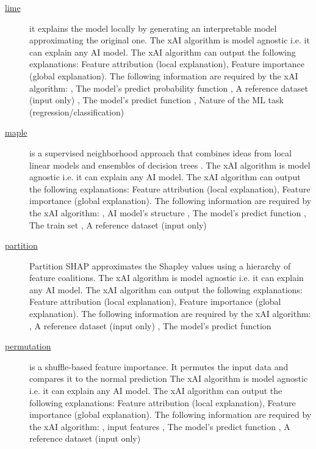 \begin{description}
\item[\href{https://github.com/Karim-53/Compare-xAI/blob/main/explainers/lime.py}{lime}] 
 \citep{ribeiro2016should} 
it explains the model locally by generating an interpretable model approximating the original one. 
The xAI algorithm is model agnostic i.e. it can explain any AI model. 
The xAI algorithm can output the following explanations: Feature attribution (local explanation), Feature importance (global explanation). 
The following information are required by the xAI algorithm: 
			 , The model's predict probability function
			 , A reference dataset (input only)
			 , The model's predict function
			 , Nature of the ML task (regression/classification)

\item[\href{https://github.com/Karim-53/Compare-xAI/blob/main/explainers/maple.py}{maple}] 
 \citep{plumb2018model} 
is a supervised neighborhood approach that combines ideas from local linear models and ensembles of decision trees \citep{plumb2018model}. 
The xAI algorithm is model agnostic i.e. it can explain any AI model. 
The xAI algorithm can output the following explanations: Feature attribution (local explanation), Feature importance (global explanation). 
The following information are required by the xAI algorithm: 
			 , AI model's structure
			 , The model's predict function
			 , The train set
			 , A reference dataset (input only)

\item[\href{https://github.com/Karim-53/Compare-xAI/blob/main/explainers/shap_explainer.py}{partition}] 
 \citep{lundberg2017unified} 
Partition SHAP approximates the Shapley values using a hierarchy of feature coalitions. 
The xAI algorithm is model agnostic i.e. it can explain any AI model. 
The xAI algorithm can output the following explanations: Feature attribution (local explanation), Feature importance (global explanation). 
The following information are required by the xAI algorithm: 
			 , A reference dataset (input only)
			 , The model's predict function

\item[\href{https://github.com/Karim-53/Compare-xAI/blob/main/explainers/shap_explainer.py}{permutation}] 
 
is a shuffle-based feature importance. It permutes the input data and compares it to the normal prediction 
The xAI algorithm is model agnostic i.e. it can explain any AI model. 
The xAI algorithm can output the following explanations: Feature attribution (local explanation), Feature importance (global explanation). 
The following information are required by the xAI algorithm: 
			 , input features
			 , The model's predict function
			 , A reference dataset (input only)


\end{description}
